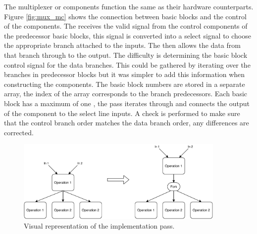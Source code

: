 The multiplexer or  components function the same as their hardware counterparts. Figure \ref{fig:mux_mc} shows the connection between basic blocks and the control of the  components. The  receives the valid signal from the control components of the predecessor basic blocks, this signal is converted into a select signal to choose the appropriate branch attached to the  inputs. The  then allows the data from that branch through to the output. The difficulty is determining the basic block control signal for the data branches. This could be gathered by iterating over the branches in predecessor blocks but it was simpler to add this information when constructing the  components. The basic block numbers are stored in a separate array, the index of the array corresponds to the branch predecessors. Each basic block has a maximum of one , the pass iterates through and connects the output of the component to the  select line inputs. A check is performed to make sure that the control branch order matches the data branch order, any differences are corrected.

\begin{figure}[htb!]
    \centering
    \includegraphics[width=0.9\textwidth]{Images/fork_pass.pdf}
    \caption{Visual representation of the  implementation pass.}
    \label{fig:fork_pass}
\end{figure}

